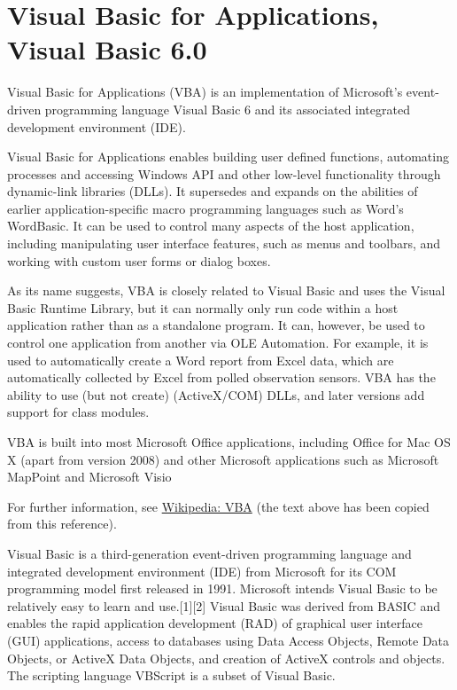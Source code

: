 	
	
	
	\newpage
	\section{Visual Basic for Applications, Visual Basic 6.0}
	
	Visual Basic for Applications (VBA) is an implementation of Microsoft's event-driven programming language Visual Basic 6 and its associated integrated development environment (IDE).
	
	\vpara
	Visual Basic for Applications enables building user defined functions, automating processes and accessing Windows API and other low-level functionality through dynamic-link libraries (DLLs). It supersedes and expands on the abilities of earlier application-specific macro programming languages such as Word's WordBasic. It can be used to control many aspects of the host application, including manipulating user interface features, such as menus and toolbars, and working with custom user forms or dialog boxes.
	
	\vpara
	As its name suggests, VBA is closely related to Visual Basic and uses the Visual Basic Runtime Library, but it can normally only run code within a host application rather than as a standalone program. It can, however, be used to control one application from another via OLE Automation. For example, it is used to automatically create a Word report from Excel data, which are automatically collected by Excel from polled observation sensors. VBA has the ability to use (but not create) (ActiveX/COM) DLLs, and later versions add support for class modules.
	
	\vpara
	VBA is built into most Microsoft Office applications, including Office for Mac OS X (apart from version 2008) and other Microsoft applications such as Microsoft MapPoint and Microsoft Visio
	
	For further information, see \href{http://en.wikipedia.org/wiki/Visual_Basic_for_Applications}{Wikipedia: VBA} (the text above has been copied from this reference).
	
	\vpara
	Visual Basic is a third-generation event-driven programming language and integrated development environment (IDE) from Microsoft for its COM programming model first released in 1991. Microsoft intends Visual Basic to be relatively easy to learn and use.[1][2] Visual Basic was derived from BASIC and enables the rapid application development (RAD) of graphical user interface (GUI) applications, access to databases using Data Access Objects, Remote Data Objects, or ActiveX Data Objects, and creation of ActiveX controls and objects. The scripting language VBScript is a subset of Visual Basic.
	
